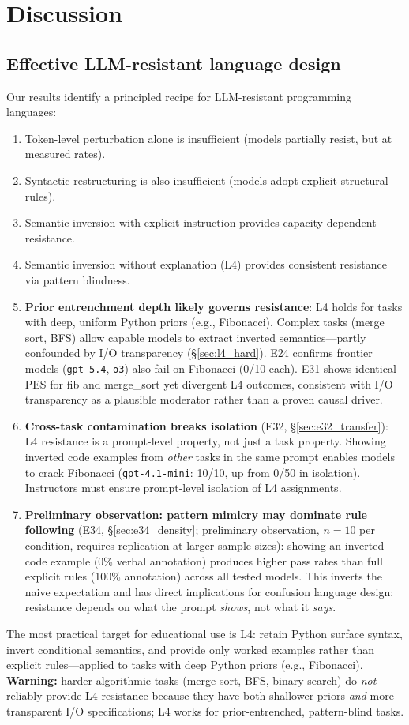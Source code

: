 \section{Discussion}
\subsection{Effective LLM-resistant language design}
Our results identify a principled recipe for LLM-resistant programming languages:
\begin{enumerate}
  \item Token-level perturbation alone is insufficient (models partially resist, but at measured rates).
  \item Syntactic restructuring is also insufficient (models adopt explicit structural rules).
  \item Semantic inversion with explicit instruction provides capacity-dependent resistance.
  \item Semantic inversion without explanation (L4) provides consistent resistance via pattern blindness.
  \item \textbf{Prior entrenchment depth likely governs resistance}: L4 holds for tasks with deep, uniform Python priors (e.g., Fibonacci). Complex tasks (merge sort, BFS) allow capable models to extract inverted semantics---partly confounded by I/O transparency (\S\ref{sec:l4_hard}). E24 confirms frontier models (\texttt{gpt-5.4}, \texttt{o3}) also fail on Fibonacci (0/10 each). E31 shows identical PES for fib and merge\_sort yet divergent L4 outcomes, consistent with I/O transparency as a plausible moderator rather than a proven causal driver.
  \item \textbf{Cross-task contamination breaks isolation} (E32, \S\ref{sec:e32_transfer}): L4 resistance is a prompt-level property, not just a task property. Showing inverted code examples from \emph{other} tasks in the same prompt enables models to crack Fibonacci (\texttt{gpt-4.1-mini}: 10/10, up from 0/50 in isolation). Instructors must ensure prompt-level isolation of L4 assignments.
  \item \textbf{Preliminary observation: pattern mimicry may dominate rule following} (E34, \S\ref{sec:e34_density}; preliminary observation, $n{=}10$ per condition, requires replication at larger sample sizes): showing an inverted code example (0\% verbal annotation) produces higher pass rates than full explicit rules (100\% annotation) across all tested models. This inverts the naive expectation and has direct implications for confusion language design: resistance depends on what the prompt \emph{shows}, not what it \emph{says}.
\end{enumerate}
The most practical target for educational use is L4: retain Python surface syntax, invert conditional semantics, and provide only worked examples rather than explicit rules---applied to tasks with deep Python priors (e.g., Fibonacci). \textbf{Warning:} harder algorithmic tasks (merge sort, BFS, binary search) do \emph{not} reliably provide L4 resistance because they have both shallower priors \emph{and} more transparent I/O specifications; L4 works for prior-entrenched, pattern-blind tasks.

